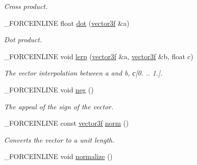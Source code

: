 \begin{DoxyCompactItemize}
\begin{DoxyCompactList}\small\item\em Cross product. \end{DoxyCompactList}\item 
\hypertarget{classbt_1_1vector3f_a076b1b99477123c1f0cd59484d5bd091}{\-\_\-\-F\-O\-R\-C\-E\-I\-N\-L\-I\-N\-E float \hyperlink{classbt_1_1vector3f_a076b1b99477123c1f0cd59484d5bd091}{dot} (\hyperlink{classbt_1_1vector3f}{vector3f} \&a)}\label{classbt_1_1vector3f_a076b1b99477123c1f0cd59484d5bd091}

\begin{DoxyCompactList}\small\item\em Dot product. \end{DoxyCompactList}\item 
\hypertarget{classbt_1_1vector3f_ac5c2862a451515a93871f78f96bb1b6d}{\-\_\-\-F\-O\-R\-C\-E\-I\-N\-L\-I\-N\-E void \hyperlink{classbt_1_1vector3f_ac5c2862a451515a93871f78f96bb1b6d}{lerp} (\hyperlink{classbt_1_1vector3f}{vector3f} \&a, \hyperlink{classbt_1_1vector3f}{vector3f} \&b, float c)}\label{classbt_1_1vector3f_ac5c2862a451515a93871f78f96bb1b6d}

\begin{DoxyCompactList}\small\item\em The vector interpolation between a and b, с\mbox{[}0. .. 1.\mbox{]}. \end{DoxyCompactList}\item 
\hypertarget{classbt_1_1vector3f_a9e2cf66f23cb6f990fce82e2d14ea3ee}{\-\_\-\-F\-O\-R\-C\-E\-I\-N\-L\-I\-N\-E void \hyperlink{classbt_1_1vector3f_a9e2cf66f23cb6f990fce82e2d14ea3ee}{neg} ()}\label{classbt_1_1vector3f_a9e2cf66f23cb6f990fce82e2d14ea3ee}

\begin{DoxyCompactList}\small\item\em The appeal of the sign of the vector. \end{DoxyCompactList}\item 
\hypertarget{classbt_1_1vector3f_aceeb3fe8a7147bd2f0936304c9ad1af4}{\-\_\-\-F\-O\-R\-C\-E\-I\-N\-L\-I\-N\-E const \hyperlink{classbt_1_1vector3f}{vector3f} \hyperlink{classbt_1_1vector3f_aceeb3fe8a7147bd2f0936304c9ad1af4}{norm} ()}\label{classbt_1_1vector3f_aceeb3fe8a7147bd2f0936304c9ad1af4}

\begin{DoxyCompactList}\small\item\em Converts the vector to a unit length. \end{DoxyCompactList}\item 
\hypertarget{classbt_1_1vector3f_a8313b691adfe10c8794a9e290afe6e86}{\-\_\-\-F\-O\-R\-C\-E\-I\-N\-L\-I\-N\-E void \hyperlink{classbt_1_1vector3f_a8313b691adfe10c8794a9e290afe6e86}{normalize} ()}\label{classbt_1_1vector3f_a8313b691adfe10c8794a9e290afe6e86}


\end{DoxyCompactItemize}

